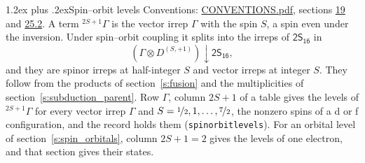 \documentclass[10pt,a4paper]{article}
\makeatletter
\renewcommand\section{\@startsection{section}{1}{\z@}{-3ex plus -1ex minus -.2ex}%
  {1.2ex plus .2ex}{\normalfont\large\sffamily\bfseries\color{parttitle}}}
\numberwithin{equation}{section}
\newcommand{\grp}[1]{\mathsf{#1}}
\newcommand{\restr}[2]{#1\!\downarrow#2}
\newcommand{\irrJp}[2]{D^{(#1,#2)}}
\newcommand{\irrprod}{\otimes}
\newcommand{\term}[2]{{}^{#1}#2}
\makeatother
\begin{document}
\section{Spin--orbit levels}\label{s:spin_orbit}
Conventions: \href{../../CONVENTIONS.pdf}{CONVENTIONS.pdf}, sections \href{../../../rotation/CONVENTIONS.pdf\#conv.19}{19} and \href{../../CONVENTIONS.pdf\#conv.25.2}{25.2}.
\leavevmode\label{n:local.spin}\label{n:symbol.term}A term $\term{2S+1}{\Gamma}$ is the vector irrep $\Gamma$ with the spin $S$, a spin even under the inversion. Under spin--orbit coupling it splits into the irreps of $\grp{2S_{16}}$ in
\begin{equation}\label{e:spinorbit}\restr{(\Gamma \irrprod \irrJp{S}{+1})}{\grp{2S_{16}}},\end{equation}
and they are spinor irreps at half-integer $S$ and vector irreps at integer $S$. They follow from the products of section~\ref{s:fusion} and the multiplicities of section~\ref{s:subduction_parent}. Row $\Gamma$, column $2S + 1$ of a table gives the levels of $\term{2S+1}{\Gamma}$ for every vector irrep $\Gamma$ and $S = \nicefrac{1}{2}, 1, \dots, \nicefrac{7}{2}$, the nonzero spins of a d or f configuration, and the record holds them (\texttt{spinorbitlevels}). For an orbital level of section~\ref{s:spin_orbitals}, column $2S + 1 = 2$ gives the levels of one electron, and that section gives their states.
\end{document}
